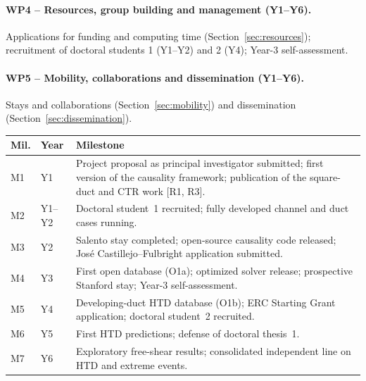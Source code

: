 \documentclass[11pt]{article}
\begin{document}
\paragraph{WP4 -- Resources, group building and management (Y1--Y6).} Applications for
funding and computing time (Section~\ref{sec:resources}); recruitment of doctoral students
1 (Y1--Y2) and 2 (Y4); Year-3 self-assessment.

\paragraph{WP5 -- Mobility, collaborations and dissemination (Y1--Y6).} Stays and
collaborations (Section~\ref{sec:mobility}) and dissemination
(Section~\ref{sec:dissemination}).

\begin{center}\small
\begin{tabularx}{\textwidth}{@{}p{0.8cm}p{1.35cm}X@{}}
\toprule
\textbf{Mil.} & \textbf{Year} & \textbf{Milestone} \\
\midrule
M1 & Y1 & Project proposal as principal investigator submitted; first version of the causality framework; publication of the square-duct and CTR work [R1, R3]. \\
M2 & Y1--Y2 & Doctoral student~1 recruited; fully developed channel and duct cases running. \\
M3 & Y2 & Salento stay completed; open-source causality code released; José Castillejo--Fulbright application submitted. \\
M4 & Y3 & First open database (O1a); optimized solver release; prospective Stanford stay; Year-3 self-assessment. \\
M5 & Y4 & Developing-duct HTD database (O1b); ERC Starting Grant application; doctoral student~2 recruited. \\
M6 & Y5 & First HTD predictions; defense of doctoral thesis~1. \\
M7 & Y6 & Exploratory free-shear results; consolidated independent line on HTD and extreme events. \\
\bottomrule
\end{tabularx}
\end{center}
\end{document}
